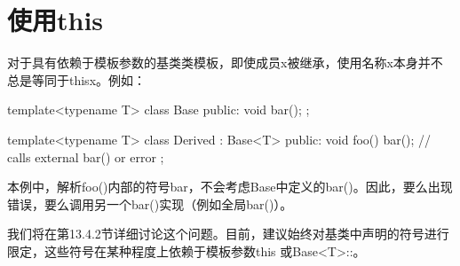 \section{使用this\inlcpp{->}}
对于具有依赖于模板参数的基类类模板，即使成员x被继承，使用名称x本身并不总是等同于this\inlcpp{->}x。例如：

\begin{cpp}
template<typename T>
class Base {
public:
	void bar();
};

template<typename T>
class Derived : Base<T> {
public:
	void foo() {
		bar(); // calls external bar() or error
	}
};
\end{cpp}

本例中，解析foo()内部的符号bar，不会考虑Base中定义的bar()。因此，要么出现错误，要么调用另一个bar()实现（例如全局bar()）。

我们将在第13.4.2节详细讨论这个问题。目前，建议始终对基类中声明的符号进行限定，这些符号在某种程度上依赖于模板参数this\inlcpp{->} 或Base<T>::。














































